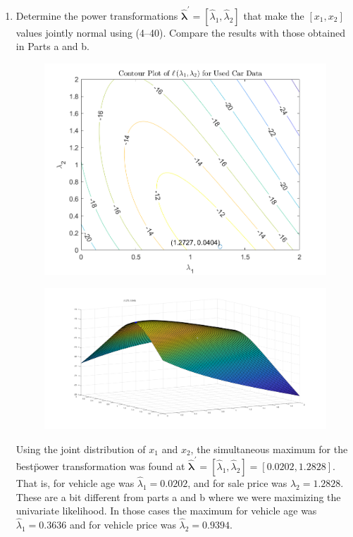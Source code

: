 \begin{enumerate}[label= (\alph*)]
    \item Determine the power transformations $\hat{\bm{\lambda}}^{\prime} = [\hat{\lambda}_{1}, \hat{\lambda}_{2}]$ that make the $[x_{1}, x_{2}]$ values
    jointly normal using (4--40). Compare the results with those obtained in Parts a and b.
    
    \begin{figure}[H]
        \includegraphics[scale=0.8]{./matlab/chapter-4/sol4.30c.png}
    \end{figure}
    \begin{figure}[H]
        \includegraphics[scale=0.8]{./matlab/chapter-4/sol4.30c_surf.png}
    \end{figure}
    \par
    Using the joint distribution of $x_{1}$ and $x_{2}$,
     the simultaneous maximum for the \"best\" power transformation
     was found at $\hat{\bm{\lambda}}^{\prime} = [\hat{\lambda}_{1}, \hat{\lambda}_{2}] = [0.0202, 1.2828]$.
    That is, for vehicle age was $\hat{\lambda}_{1} = 0.0202$, and for sale price was $\hat{\lambda}_{2} = 1.2828$.
    These are a bit different from parts a and b where we were maximizing the univariate likelihood.
    In those cases the maximum for vehicle age was $\hat{\lambda}_{1} = 0.3636$ and for vehicle price was $\hat{\lambda}_{2} = 0.9394$.
\end{enumerate}